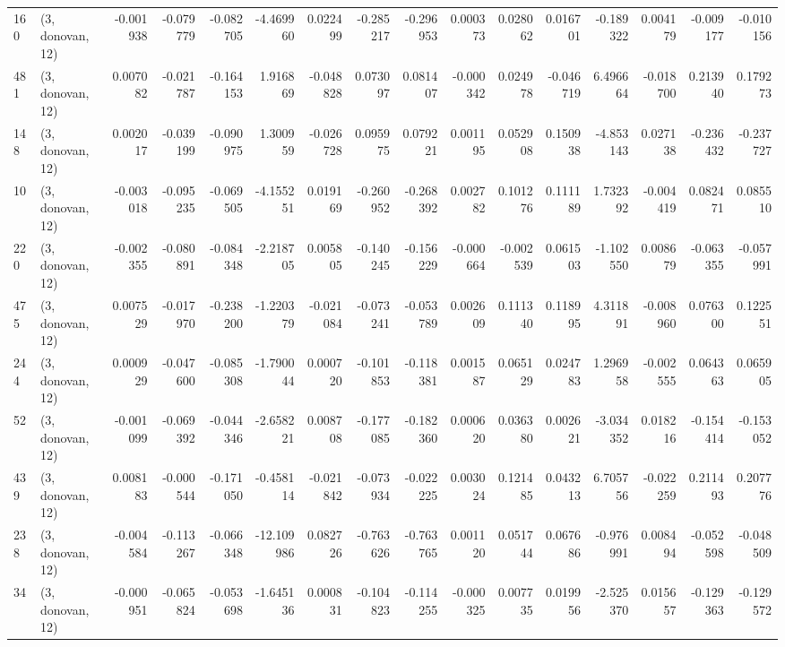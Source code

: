 \begin{tabular}{llrrrrrrrrrrrrrr}
160 &  (3, donovan, 12) &  -0.001938 & -0.079779 & -0.082705 &   -4.469960 &  0.022499 &  -0.285217 & -0.296953 &  0.000373 &  0.028062 &  0.016701 &    -0.189322 &  0.004179 & -0.009177 & -0.010156 \\
481 &  (3, donovan, 12) &   0.007082 & -0.021787 & -0.164153 &    1.916869 & -0.048828 &   0.073097 &  0.081407 & -0.000342 &  0.024978 & -0.046719 &     6.496664 & -0.018700 &  0.213940 &  0.179273 \\
148 &  (3, donovan, 12) &   0.002017 & -0.039199 & -0.090975 &    1.300959 & -0.026728 &   0.095975 &  0.079221 &  0.001195 &  0.052908 &  0.150938 &    -4.853143 &  0.027138 & -0.236432 & -0.237727 \\
10  &  (3, donovan, 12) &  -0.003018 & -0.095235 & -0.069505 &   -4.155251 &  0.019169 &  -0.260952 & -0.268392 &  0.002782 &  0.101276 &  0.111189 &     1.732392 & -0.004419 &  0.082471 &  0.085510 \\
220 &  (3, donovan, 12) &  -0.002355 & -0.080891 & -0.084348 &   -2.218705 &  0.005805 &  -0.140245 & -0.156229 & -0.000664 & -0.002539 &  0.061503 &    -1.102550 &  0.008679 & -0.063355 & -0.057991 \\
475 &  (3, donovan, 12) &   0.007529 & -0.017970 & -0.238200 &   -1.220379 & -0.021084 &  -0.073241 & -0.053789 &  0.002609 &  0.111340 &  0.118995 &     4.311891 & -0.008960 &  0.076300 &  0.122551 \\
244 &  (3, donovan, 12) &   0.000929 & -0.047600 & -0.085308 &   -1.790044 &  0.000720 &  -0.101853 & -0.118381 &  0.001587 &  0.065129 &  0.024783 &     1.296958 & -0.002555 &  0.064363 &  0.065905 \\
52  &  (3, donovan, 12) &  -0.001099 & -0.069392 & -0.044346 &   -2.658221 &  0.008708 &  -0.177085 & -0.182360 &  0.000620 &  0.036380 &  0.002621 &    -3.034352 &  0.018216 & -0.154414 & -0.153052 \\
439 &  (3, donovan, 12) &   0.008183 & -0.000544 & -0.171050 &   -0.458114 & -0.021842 &  -0.073934 & -0.022225 &  0.003024 &  0.121485 &  0.043213 &     6.705756 & -0.022259 &  0.211493 &  0.207776 \\
238 &  (3, donovan, 12) &  -0.004584 & -0.113267 & -0.066348 &  -12.109986 &  0.082726 &  -0.763626 & -0.763765 &  0.001120 &  0.051744 &  0.067686 &    -0.976991 &  0.008494 & -0.052598 & -0.048509 \\
34  &  (3, donovan, 12) &  -0.000951 & -0.065824 & -0.053698 &   -1.645136 &  0.000831 &  -0.104823 & -0.114255 & -0.000325 &  0.007735 &  0.019956 &    -2.525370 &  0.015657 & -0.129363 & -0.129572 \\

\end{tabular}
